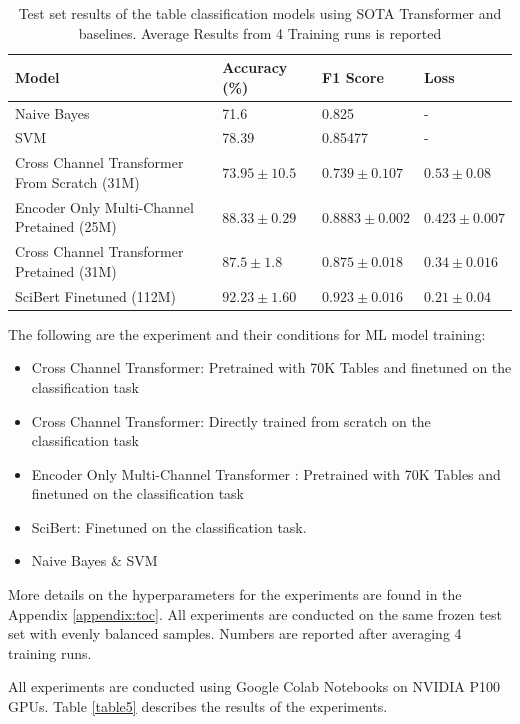 \begin{table}[h]
    \label{table\arabic{tablecounter}}
    \centering
    \begin{tabular}{|p{4cm}|p{3cm}|p{3cm}|p{3cm}|}
    \hline
        \textbf{Model} & \textbf{Accuracy} (\%) & \textbf{F1 Score}  & \textbf{Loss} \\ \hline
        Naive Bayes & 71.6 & 0.825 & - \\ \hline
        SVM  & 78.39 & 0.85477 & - \\ \hline
        Cross Channel Transformer From Scratch (31M) & $73.95 \pm 10.5 $ & $0.739 \pm 0.107$ & $0.53 \pm 0.08$ \\ \hline
        Encoder Only Multi-Channel Pretained (25M) & $88.33 \pm 0.29$ & $0.8883 \pm 0.002$ & $0.423 \pm 0.007$ \\ \hline
        Cross Channel Transformer Pretained (31M) & $87.5 \pm 1.8$ & $0.875 \pm 0.018$ & $0.34 \pm 0.016$ \\ \hline
        SciBert Finetuned (112M) & $92.23 \pm 1.60$ & $0.923 \pm 0.016$ & $0.21 \pm 0.04$ \\ \hline
    \end{tabular}
    \caption{\label{tablecounter} Test set results of the table classification models using SOTA Transformer and baselines. Average Results from 4 Training runs is reported}
\end{table}
The following are the experiment and their conditions for ML model training:
\begin{itemize}
    \item Cross Channel Transformer: Pretrained with 70K Tables and finetuned on the classification task
    \item Cross Channel Transformer: Directly trained from scratch on the classification task 
    \item Encoder Only Multi-Channel Transformer : Pretrained with 70K Tables and finetuned on the classification task
    \item SciBert: Finetuned on the classification task.
    \item Naive Bayes \& SVM
\end{itemize}
More details on the hyperparameters for the experiments are found in the Appendix \ref{appendix:toc}. All experiments are conducted on the same frozen test set with evenly balanced samples. Numbers are reported after averaging 4 training runs.

All experiments are conducted using Google Colab Notebooks on NVIDIA P100 GPUs. Table \ref{table5} describes the results of the experiments. 


